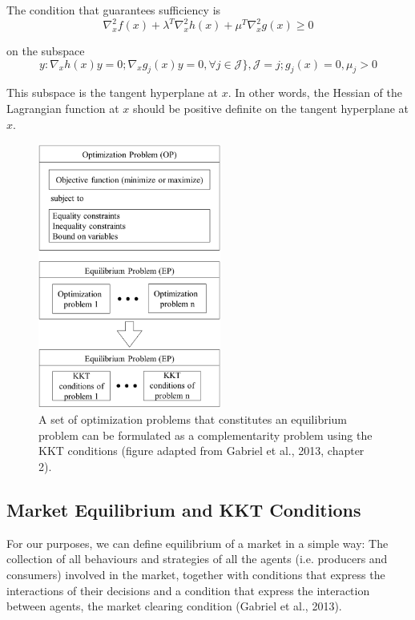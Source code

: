 \documentclass[11pt, letterpaper]{article}
\begin{document}
The condition that guarantees sufficiency is 
\begin{equation}
    \nabla^{2}_{x} f(x) + \lambda^{T} \nabla^{2}_{x} h(x) + \mu^{T} \nabla^{2}_{x} g(x) \geq 0
\end{equation}

on the subspace
\begin{equation}
    y: \nabla_{x} h(x) y =0; \nabla_{x} g_j(x) y =0, \forall j \in \mathcal{J}\}, \mathcal{J} = j; g_{j}(x) = 0, \mu_{j} > 0
\end{equation}


This subspace is the tangent hyperplane at $x$. In other words, the Hessian of the Lagrangian function at $x$ should be positive definite on the tangent hyperplane at $x$.

\begin{figure}[ht!]
  \begin{center}
    \includegraphics[width=6cm]{Informe/EP.png}
  \end{center}
 \caption{A set of optimization problems that constitutes an equilibrium problem can be formulated as a complementarity problem using the KKT conditions (figure adapted from Gabriel et al., 2013, chapter 2). }
 \label{opt-eq}
\end{figure}

\subsection{Market Equilibrium and KKT Conditions}

For our purposes, we can define equilibrium of a market in a simple way: The collection of all behaviours and strategies of all the agents (i.e. producers and consumers) involved in the market, together with conditions that express the interactions of their decisions and a condition that express the interaction between agents, the market clearing condition (Gabriel et al., 2013). 
\smallskip
\end{document}
